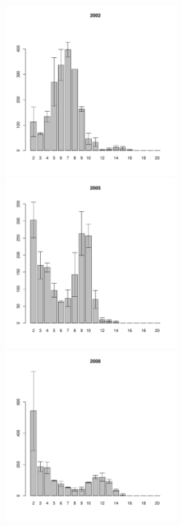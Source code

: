 \documentclass[12pt, a4paper]{article}
\begin{document}
\begin{figure}[h]
\begin{multicols}{3}
\hfill
\includegraphics[width=65mm]{../White_Sea/Estuatiy_Luvenga/sizestr2_2002_.pdf}
\hfill
\includegraphics[width=65mm]{../White_Sea/Estuatiy_Luvenga/sizestr2_2005_.pdf}
\hfill
\includegraphics[width=65mm]{../White_Sea/Estuatiy_Luvenga/sizestr2_2008_.pdf}
\end{multicols}




\end{figure}
\end{document}
